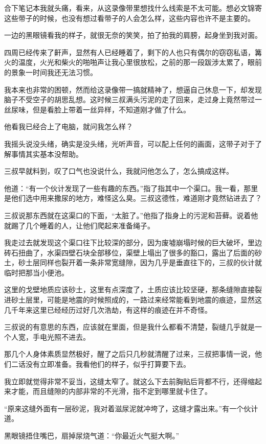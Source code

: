 合下笔记本我就头痛，看来，从这录像带里想找什么线索是不太可能。想必文锦寄这些带子的时候，也没有想过看带子的人会怎么样，这些内容也许不是主要的。

一边的黑眼镜看我的样子，就很无奈的笑笑，拍了拍我的肩膀，起身坐到我对面。

四周已经传来了鼾声，显然有人已经睡着了，剩下的人也只有偶尔的窃窃私语，篝火的温度，火光和柴火的啪啪声让我心里很放松，之前的那一段跋涉太累了，眼前的景象一时间我还无法习惯。

我本来也非常的困顿，然而给这录像带一搞就精神了，想逼自己休息一下，却发现脑子不受空子的胡思乱想。这时候三叔满头污泥的走了回来，走过身上竟然带过一丝尿味，但是看脸上带着一丝异样，不知道刚才做了什么。

他看我已经合上了电脑，就问我怎么样？

我摇头说没头绪，确实是没头绪，光听声音，可以配上任何的画面，这带子对于了解事情其实基本没帮助。

三叔早就料到，叹了口气也没说什么，我就问他怎么了，怎么搞成这样。

他道：“有一个伙计发现了一些有趣的东西。”指了指其中一个渠口。我一看，那里是他们选中用来撒尿的地方，难怪这么臭。三叔这德性，难道刚才竟然钻进去了？

三叔说那东西就在这渠口的下面，“太脏了。”他指了指身上的污泥和苔藓。说着他就踢了几个睡着的人，让他们爬起来准备绳子。

我走过去就发现这个渠口往下比较深的部分，因为废墟崩塌时候的巨大破坏，里边砖石扭曲了，水渠四壁石块全部移位，渠壁上塌出了很多的豁口，露出了后面的砂土，砂土层同样也裂开着一条非常宽缝隙，因为几乎是垂直往下的，三叔的伙计就临时把那当小便池。

这里的戈壁地质应该砂土，这里有点深度了，土质应该比较坚硬，那条缝隙直接裂进砂土层里，可能是地震的时候照成的，一路过来经常能看到地震的痕迹，显然这几千年来这里已经经历过好几次浩劫，有这样的痕迹在并不奇怪。

三叔说的有意思的东西，应该就在里面，但是我什么都看不清楚，裂缝几乎就是一个人宽，手电光照不进去。

那几个人身体素质显然极好，醒了之后只几秒就清醒了过来，三叔把事情一说，他们二话没有立即准备。我看他们的样子，似乎打算要下去。

我立即就觉得非常不妥当，这缝太窄了。就这么下去前胸贴后背都不行，还得缩起来才能，而且缝隙的内部非常的不光滑，指不定到哪里就卡住了。

“原来这缝外面有一层砂泥，我对着滋尿泥就冲垮了，这缝才露出来。”有一个伙计道。

黑眼镜捂住嘴巴，扇掉尿烧气道：“你最近火气挺大啊。”

